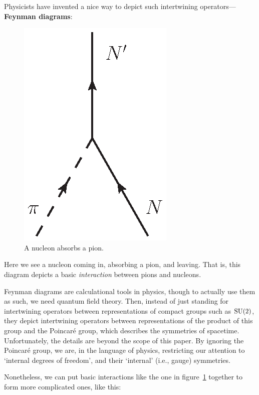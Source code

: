 \documentclass[12pt]{article}
\newcommand{\SU}{{\rm SU}}    %
\begin{document}
Physicists have invented a nice way to depict such
intertwining operators---\textbf{Feynman diagrams}:
\begin{figure}[H]
	\begin{center}
		\includegraphics[scale=0.75]{piN_vertex}
	\end{center}
	\caption{A nucleon absorbs a pion.} \label{fig:piN_vertex}
\end{figure}

\noindent
Here we see a nucleon coming in, absorbing a pion, and leaving. That is, this
diagram depicts a basic \emph{interaction} between pions and nucleons.

Feynman diagrams are calculational tools in physics, though to actually
use them as such, we need quantum field theory. Then, instead of just
standing for intertwining operators between representations of compact
groups such as $\SU(2)$, they depict intertwining operators between
representations of the product of this group and the Poincar\'e group, 
which describes the symmetries of spacetime.  Unfortunately, the 
details are beyond the scope of this paper.  By ignoring the 
Poincar\'e group, we are, in the language of physics, restricting 
our attention to `internal degrees of freedom', and their `internal' 
(i.e., gauge) symmetries.

Nonetheless, we can put basic interactions like the one in
figure~\ref{fig:piN_vertex} together to form more complicated ones, like
this:
\end{document}
